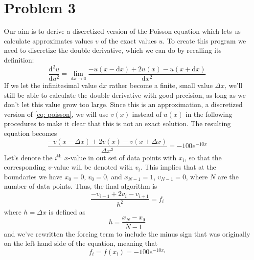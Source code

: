 \documentclass[english,notitlepage]{revtex4-1}  %
\begin{document}
\section*{Problem 3}
Our aim is to derive a discretized version of the Poisson equation which lets us calculate approximates values $v$ of the exact values $u$. To create this program we need to discretize the double derivative, which we can do by recalling its definition:
\begin{equation}
    \frac{\text{d}^2u}{\text{d}u^2} = \lim_{\text{d}x\to 0}\frac{-u(x -\text{d}x) + 2u(x) - u(x + \text{d}x)}{\text{d}x^2} 
\end{equation}
If we let the infinitesimal value $\text{d}x$ rather become a finite, small value $\Delta x$, we'll still be able to calculate the double derivative with good precision, as long as we don't let this value grow too large. Since this is an approximation, a discretized version of \cref{eq: poisson}, we will use $v(x)$ instead of $u(x)$ in the following procedures to make it clear that this is not an exact solution. The resulting equation becomes
\begin{equation}
    \frac{-v(x -\Delta x) + 2v(x) - v(x + \Delta x) }{\Delta x^2} = -100e^{-10x} 
\end{equation}
Let's denote the $i^\text{th}$ $x$-value in out set of data points with $x_i$, so that the corresponding $v$-value will be denoted with $v_i$. This implies that at the boundaries we have $x_0 = 0$, $v_0 = 0$, and $x_{N-1} = 1$, $v_{N-1} = 0$, where $N$ are the number of data points. Thus, the final algorithm is
\begin{equation}
    \frac{-v_{i-1} + 2v_i - v_{i+1}}{h^2} = f_i \label{discretized poisson}
\end{equation}
where $h = \Delta x$ is defined as
\begin{equation}
    h = \frac{x_N - x_0}{N-1}
\end{equation}
and we've rewritten the forcing term to include the minus sign that was originally on the left hand side of the equation, meaning that
\begin{equation}
    f_i = f(x_i) = -100e^{-10x_i}
\end{equation}
\end{document}
